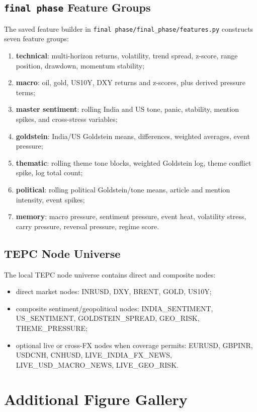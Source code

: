 \documentclass[11pt,a4paper]{article}
\begin{document}
\subsection{\texttt{final phase} Feature Groups}

The saved feature builder in \texttt{final phase/final\_phase/features.py} constructs seven feature groups:
\begin{enumerate}[leftmargin=*]
    \item \textbf{technical}: multi-horizon returns, volatility, trend spread, z-score, range position, drawdown, momentum stability;
    \item \textbf{macro}: oil, gold, US10Y, DXY returns and z-scores, plus derived pressure terms;
    \item \textbf{master sentiment}: rolling India and US tone, panic, stability, mention spikes, and cross-stress variables;
    \item \textbf{goldstein}: India/US Goldstein means, differences, weighted averages, event pressure;
    \item \textbf{thematic}: rolling theme tone blocks, weighted Goldstein log, theme conflict spike, log total count;
    \item \textbf{political}: rolling political Goldstein/tone means, article and mention intensity, event spikes;
    \item \textbf{memory}: macro pressure, sentiment pressure, event heat, volatility stress, carry pressure, reversal pressure, regime score.
\end{enumerate}

\subsection{TEPC Node Universe}

The local TEPC node universe contains direct and composite nodes:
\begin{itemize}[leftmargin=*]
    \item direct market nodes: INRUSD, DXY, BRENT, GOLD, US10Y;
    \item composite sentiment/geopolitical nodes: INDIA\_SENTIMENT, US\_SENTIMENT, GOLDSTEIN\_SPREAD, GEO\_RISK, THEME\_PRESSURE;
    \item optional live or cross-FX nodes when coverage permits: EURUSD, GBPINR, USDCNH, CNHUSD, LIVE\_INDIA\_FX\_NEWS, LIVE\_USD\_MACRO\_NEWS, LIVE\_GEO\_RISK.
\end{itemize}

\section{Additional Figure Gallery}
\label{app:figures}
\end{document}
